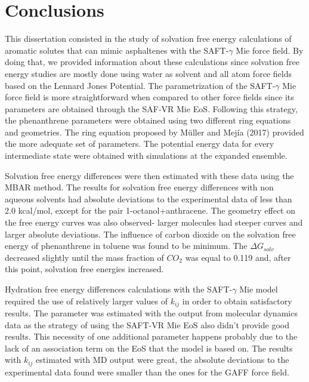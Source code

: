 \chapter{Conclusions} %

\label{Chapter6} %

This dissertation consisted in  the study of solvation free
energy calculations of aromatic solutes that can mimic asphaltenes with the SAFT-$\gamma$ 
Mie force field. By doing that, we provided information about these calculations since solvation free energy studies are mostly done using  water as solvent and all atom force fields based on the Lennard Jones Potential. The parametrization of the SAFT-$\gamma$  Mie force field is more straightforward
when compared to other force fields since its parameters are obtained through the SAF-VR
Mie EoS. Following this strategy, the phenanthrene parameters were obtained using two
different ring equations and geometries. The ring equation proposed by Müller and Mejía
(2017) provided the more adequate set of parameters.
The potential energy data for every intermediate state were obtained with simulations at the expanded ensemble. 

Solvation free energy differences were then
estimated with these data using the MBAR method. The results for solvation free energy differences with non aqueous solvents had absolute deviations to the experimental
data of less than 2.0 kcal/mol, except for the pair 1-octanol+anthracene. The geometry
effect on the free energy curves was also observed- larger molecules had steeper curves
and larger absolute deviations. The influence of carbon dioxide on the solvation free
energy of phenanthrene in toluene was found to be minimum. The $\Delta G_{solv}$ decreased slightly until the mass fraction of $CO_{2}$ was equal to 0.119 and, after this point, solvation free
energies increased. 

Hydration free energy differences calculations with the SAFT-$\gamma$ Mie model
required the use of relatively larger values of $k_{ij}$ in order to obtain satisfactory results.
The parameter was estimated with the output from molecular dynamics data as
the strategy of using the SAFT-VR Mie EoS also didn’t provide good results. This
necessity of one additional parameter happens probably due to the lack of an association term
on the EoS that the model is based on. The results with $k_{ij}$ estimated with MD output
were great, the absolute deviations to the experimental data found were smaller than
the ones for the GAFF force field.

